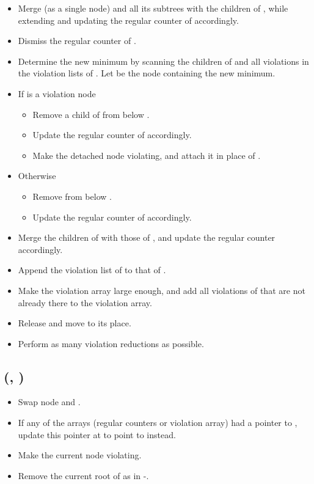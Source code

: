 \documentclass{llncs}
\newcommand{\Deletemin}{\mbox{\mbox{\rm -}}}
\newcommand{\Delete}{\mbox{}}
\begin{document}
\begin{itemize}
\item Merge  (as a single node) and all its subtrees with the children of ,
while extending and updating the regular counter of  accordingly.
\item Dismiss the regular counter of .
\item Determine the new minimum by scanning the children of
 and all violations in the violation lists of . Let  be
  the node containing the new minimum.
\item If  is a violation node
 \begin{itemize}
   \item Remove a child of  from below .
   \item Update the regular counter of  accordingly.
   \item Make the detached node violating, and attach it in place of .
 \end{itemize}  
\item Otherwise
 \begin{itemize}
   \item Remove  from below .
   \item Update the regular counter of  accordingly.
 \end{itemize}
\item Merge the children of  with those of ,
			and update the regular counter accordingly.
\item Append the violation list of  to that of .
\item Make the violation array large enough, and add all
  violations of  that are not already there to the violation array.
\item Release  and move  to its place.
\item Perform as many violation reductions as possible.
\end{itemize}

\subsection*{\Delete{}(, )}
\begin{itemize}
\item Swap node  and .
\item If any of the arrays (regular counters or violation array) had a pointer
  to , update this pointer at  to point to 
  instead. 
\item Make the current node  violating.
\item Remove the current root of  as in \Deletemin{}. 
\end{itemize}
\end{document}
